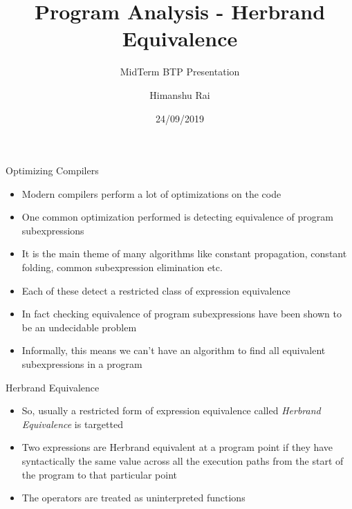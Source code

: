 \documentclass[11pt]{beamer}
\title{Program Analysis - Herbrand Equivalence}
\subtitle{MidTerm BTP Presentation}
\author{Himanshu Rai}
\institute{Indian Institute of Technology, Palakkad}
\date{24/09/2019}
\begin{document}
\begin{frame}
\titlepage
\end{frame}

\begin{frame}{Optimizing Compilers}
    \begin{itemize}
        \item Modern compilers perform a lot of optimizations on the code
        \item One common optimization performed is detecting equivalence of program subexpressions
        \item It is the main theme of many algorithms like constant propagation, constant folding, common subexpression elimination etc.
        \item Each of these detect a restricted class of expression equivalence
        \item In fact checking equivalence of program subexpressions have been shown to be an undecidable problem
        \item Informally, this means we can't have an algorithm to find all equivalent subexpressions in a program
    \end{itemize}
\end{frame}

\begin{frame}{Herbrand Equivalence}
    \begin{itemize}
        \item So, usually a restricted form of expression equivalence called \textit{Herbrand Equivalence} is targetted
        \item Two expressions are Herbrand equivalent at a program point if they have syntactically the same value across all the execution paths from the start of the program to that particular point
        \item The operators are treated as uninterpreted functions
    \end{itemize}
\end{frame}
\end{document}
